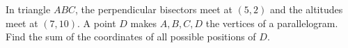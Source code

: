 In triangle $ABC$, the perpendicular bisectors meet at $(5,2)$ and the altitudes meet at $(7,10)$. A point $D$ makes $A,B,C,D$ the vertices of a parallelogram. Find the sum of the coordinates of all possible positions of $D$.

